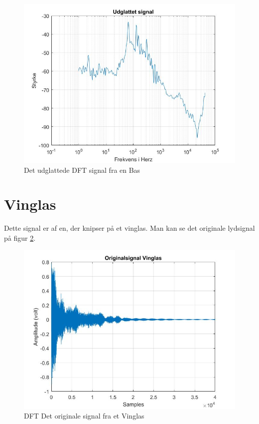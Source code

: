 \begin{figure}[H]
	\centering
	\includegraphics[width=140mm]{figures/Bass/udglattet.jpg}
	\caption{Det udglattede DFT signal fra en Bas}
	\label{fig:Bas udglattet}
\end{figure}



\section{Vinglas}
Dette signal er af en, der knipser på et vinglas. Man kan se det originale lydsignal på figur \ref{fig:Vinglas original}.
\begin{figure}[H]
	\centering
	\includegraphics[width=140mm]{figures/Vinglas/original.jpg}
	\caption{DFT Det originale signal fra et Vinglas}
	\label{fig:Vinglas original}
\end{figure}

